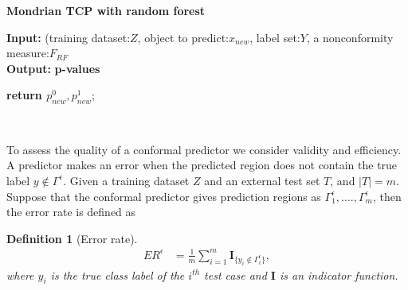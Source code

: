 \documentclass[preprint,12pt,authoryear]{elsarticle}
\newtheorem{definition}[theorem1]{Definition}
\begin{document}
\vspace{0.3cm}
\begin{algorithm}[H]
 \caption{\textbf{Mondrian TCP with random forest}} \label{algo:TCP}
 \textbf{Input:}{ (training dataset:$Z$, object to predict:$x_{new}$, label set:$Y$, a nonconformity measure:$F_{RF}$}\\
 \textbf{Output:}{\textbf{ p-values} }\\

 \textbf{return $p_{new}^0,p_{new}^1$};\\
 \end{algorithm}
 \vspace{10pt}
\textbf{ \\}

 
To assess the quality of a conformal predictor we consider validity and efficiency. A predictor makes an error when the predicted region does not contain the true label $ y \not\in \Gamma^{\epsilon}$. Given a training dataset $Z$ and an external test set $T$,  and $|T| = m$. Suppose that the conformal predictor gives prediction regions as $\Gamma_1^{\epsilon}, ...., \Gamma_m^{\epsilon}$, then the error rate is defined as 

\begin{definition}[Error rate]
\begin{align} \label{eq:errorRate}
		ER^{\epsilon} &= \frac{ 1}{m} \sum\limits_{i=1}^{m} \textbf{I}_{ \{y_i \not\in \Gamma_i^{\epsilon} \} },		
\end{align}	
where $y_i$ is the true class label of the $i^{th}$ test case and $\textbf{I}$ is an indicator function. 	
\end{definition}
\end{document}
